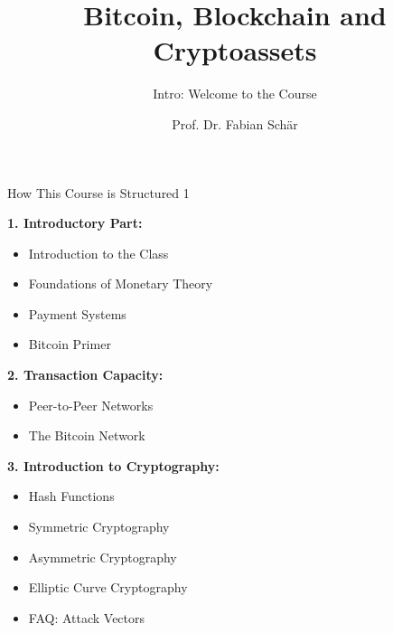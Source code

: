 \documentclass[handout]{beamer}
\title{Bitcoin, Blockchain and Cryptoassets}
\subtitle{Intro: Welcome to the Course}
\author{Prof. Dr. Fabian Schär}
\institute{University of Basel}
\begin{document}
\thispagestyle{empty}
\begin{frame}[noframenumbering]
	\titlepage
\end{frame}

\begin{frame}{How This Course is Structured 1}
\footnotesize

\textbf{1. Introductory Part:}
	\begin{itemize}
		\item Introduction to the Class
		\item Foundations of Monetary Theory
		\item Payment Systems
		\item Bitcoin Primer
	\end{itemize}
	
\vspace{0.5em}

\textbf{2. Transaction Capacity:}
	\begin{itemize}
		\item Peer-to-Peer Networks
		\item The Bitcoin Network
	\end{itemize}

\vspace{0.5em}	
	
\textbf{3. Introduction to Cryptography:}
	\begin{itemize}
		\item Hash Functions
		\item Symmetric Cryptography
		\item Asymmetric Cryptography
		\item Elliptic Curve Cryptography
		\item FAQ: Attack Vectors
	\end{itemize}
	
\end{frame}
\end{document}
